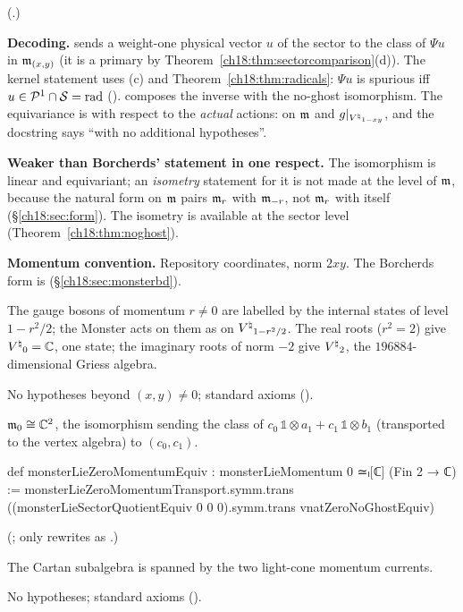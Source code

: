 (.)
\begin{dictionary}
\textbf{Decoding.}   sends a weight-one physical vector $u$ of the
sector to the class of $\Psi u$ in $\mathfrak{m}_{(x,y)}$ (it is a primary by Theorem~\ref{ch18:thm:sectorcomparison}(d)).
The kernel statement uses (c) and Theorem~\ref{ch18:thm:radicals}: $\Psi u$ is spurious iff $u\in\mathcal{P}^1\cap\mathcal{S}=\mathrm{rad}$
().   composes the inverse with the no-ghost
isomorphism.  The equivariance is with respect to the \emph{actual} actions:  on $\mathfrak{m}$
and $g|_{{V^{\natural}}_{1-xy}}$, and the docstring says ``with no additional hypotheses''.

\textbf{Weaker than Borcherds' statement in one respect.}  The isomorphism is linear and equivariant; an
\emph{isometry} statement for it is not made at the level of $\mathfrak{m}$, because the natural form on $\mathfrak{m}$ pairs
$\mathfrak{m}_r$ with $\mathfrak{m}_{-r}$, not $\mathfrak{m}_r$ with itself (\S\ref{ch18:sec:form}).  The isometry is available at the
sector level (Theorem~\ref{ch18:thm:noghost}).

\textbf{Momentum convention.}  Repository coordinates, norm $2xy$.  The Borcherds form is
 (\S\ref{ch18:sec:monsterbd}).
\end{dictionary}
\begin{physics}
The gauge bosons of momentum $r\neq0$ are labelled by the internal states of level $1-r^2/2$; the Monster
acts on them as on ${V^{\natural}}_{1-r^2/2}$.  The real roots ($r^2=2$) give ${V^{\natural}}_0=\mathbb C$, one state; the
imaginary roots of norm $-2$ give ${V^{\natural}}_2$, the $196884$-dimensional Griess algebra.
\end{physics}
\begin{status}No hypotheses beyond $(x,y)\neq0$; standard axioms ().\end{status}

\begin{theorem}\label{ch18:thm:zerospace}
$\mathfrak{m}_0\cong\mathbb C^2$, the isomorphism sending the class of $c_0\,\mathbb 1\otimes a_1+c_1\,\mathbb 1\otimes b_1$ (transported to
the vertex algebra) to $(c_0,c_1)$.
\end{theorem}
\begin{leancode}
def monsterLieZeroMomentumEquiv : monsterLieMomentum 0 ≃ₗ[ℂ] (Fin 2 → ℂ) :=
  monsterLieZeroMomentumTransport.symm.trans
    ((monsterLieSectorQuotientEquiv 0 0 0).symm.trans vnatZeroNoGhostEquiv)
\end{leancode}
(;  only rewrites
\lean{![0, 0]} as .)
\begin{physics}The Cartan subalgebra is spanned by the two light-cone momentum currents.\end{physics}
\begin{status}No hypotheses; standard axioms ().\end{status}

